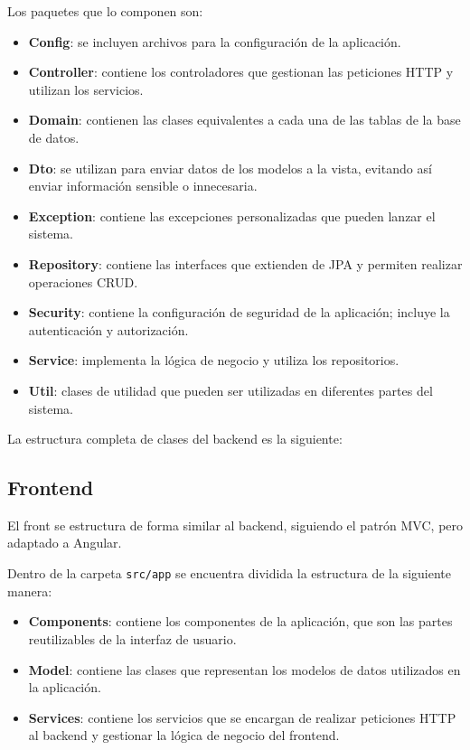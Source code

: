 Los paquetes que lo componen son:
\begin{itemize}
    \item \textbf{Config}: se incluyen archivos para la configuración de la aplicación.
    \item \textbf{Controller}: contiene los controladores que gestionan las peticiones HTTP y utilizan los servicios.
    \item \textbf{Domain}: contienen las clases equivalentes a cada una de las tablas de la base de datos.
    \item \textbf{Dto}: se utilizan para enviar datos de los modelos a la vista, evitando así enviar información
    sensible o innecesaria.
    \item \textbf{Exception}: contiene las excepciones personalizadas que pueden lanzar el sistema.
    \item \textbf{Repository}: contiene las interfaces que extienden de JPA y permiten realizar operaciones CRUD.
    \item \textbf{Security}: contiene la configuración de seguridad de la aplicación; incluye la autenticación y
    autorización.
    \item \textbf{Service}: implementa la lógica de negocio y utiliza los repositorios.
    \item \textbf{Util}: clases de utilidad que pueden ser utilizadas en diferentes partes del sistema.
\end{itemize}

La estructura completa de clases del backend es la siguiente:


\subsection{Frontend}

El front se estructura de forma similar al backend, siguiendo el patrón MVC, pero adaptado a Angular.

Dentro de la carpeta \texttt{src/app} se encuentra dividida la estructura de la siguiente manera:
\begin{itemize}
    \item \textbf{Components}: contiene los componentes de la aplicación, que son las partes reutilizables de la
    interfaz de usuario.
    \item \textbf{Model}: contiene las clases que representan los modelos de datos utilizados en la aplicación.
    \item \textbf{Services}: contiene los servicios que se encargan de realizar peticiones HTTP al backend y gestionar
    la lógica de negocio del frontend.
\end{itemize}

